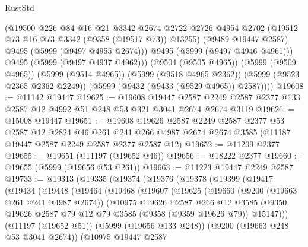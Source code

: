 \begin{lexlean}{RustStd}
\begin{coremodule}
            (@19500
              @226
              @84
              @16
              @21
              @3342
              @2674
              @2722
              @2726
              @4954
              @2702
              (@19512 @73 @16 @73 @3342 (@9358 (@19517 @73)) @13255)
              (@9489 @19447 @2587)
              @9495
              (@5999 (@9497 @4955 @2674)))
            @9495
            (@5999 (@9497 @4946 @4961)))
          @9495
          (@5999 (@9497 @4937 @4962)))
        (@9504 (@9505 @4965))
        (@5999 (@9509 @4965))
        (@5999 (@9514 @4965))
        (@5999 (@9518 @4965 @2362))
        (@5999 (@9523 @2365 @2362 @2249))
        (@5999 (@9432 (@9433 (@9529 @4965)) @2587))))
@19608 := @11142 @19447
@19625 := @19608
    @19447
    @2587
    @2249
    @2587
    @2377
    @133
    @2587
    @12
    @4992
    @51
    @248
    @53
    @321
    @3041
    @2674
    @2674
    @3119
@19626 := @15008 @19447
@19651 := @19608
    @19626
    @2587
    @2249
    @2587
    @2377
    @53
    @2587
    @12
    @2824
    @46
    @261
    @241
    @266
    @4987
    @2674
    @2674
    @3585
    (@11187 @19447 @2587 @2249 @2587 @2377 @2587 @12)
@19652 := @11209 @2377
@19655 := @19651 (@11197 (@19652 @46))
@19656 := @18222 @2377
@19660 := @19655 (@5999 (@19656 @53 @261))
@19663 := @11223 @19447 @2249 @2587
@19733 := @19313
    (@19335
      (@19374
        (@19376
          (@19378
            (@19399
              (@19417
                (@19434
                  (@19448
                    (@19464
                      (@19468
                        (@19607
                          (@19625
                            (@19660
                              (@9200 (@19663 @261 @241 @4987 @2674))
                              (@10975
                                @19626
                                @2587
                                @266
                                @12
                                @3585
                                (@9350
                                  @19626
                                  @2587
                                  @79
                                  @12
                                  @79
                                  @3585
                                  (@9358 (@9359 @19626 @79))
                                  @15147)))
                            (@11197 (@19652 @51))
                            (@5999 (@19656 @133 @248))
                            (@9200 (@19663 @248 @53 @3041 @2674))
                            (@10975
                              @19447
                              @2587

\end{coremodule}
\end{lexlean}
